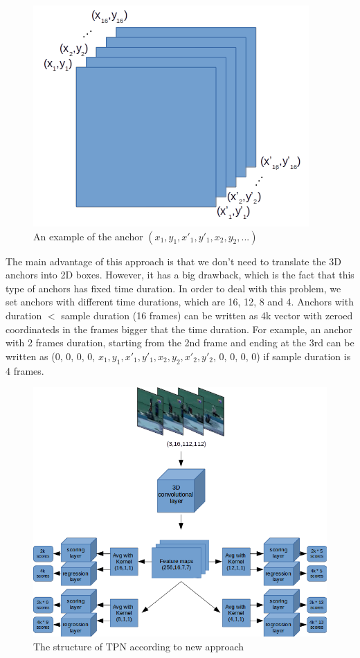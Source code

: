 \documentclass{report}
\begin{document}
\begin{figure}[h]
  \centering
  \includegraphics[scale=0.5]{anchor_4k}
  \caption{An example of the anchor $(x_1,y_1,x'_1,y'_1,x_2,y_2, ...)$}
  \label{fig:anchor_4k}
\end{figure}

The main advantage of this approach is that we don't need to translate the 3D anchors into 2D boxes. However, it has a big drawback, which is the fact that this type of anchors
has fixed time duration. In order to deal with this problem, we set anchors with different time durations, which are 16, 12, 8 and 4. Anchors with duration $ < $
sample duration (16 frames) can be written as 4k vector with zeroed coordinateds in the frames bigger that the time duration. For example, an anchor with
2 frames duration, starting from the 2nd frame and ending at the 3rd can be written as (0, 0, 0, 0, $x_1, y_1, x'_1, y'_1, x_2, y_2, x'_2, y'_2$, 0, 0, 0, 0) if sample
duration is 4 frames. 

\begin{figure}[h]
  \centering
  \includegraphics[width=1.\textwidth]{tpn_2}
  \caption{The structure of TPN according to new approach}
  \label{fig:New_structure}
\end{figure}
\end{document}
